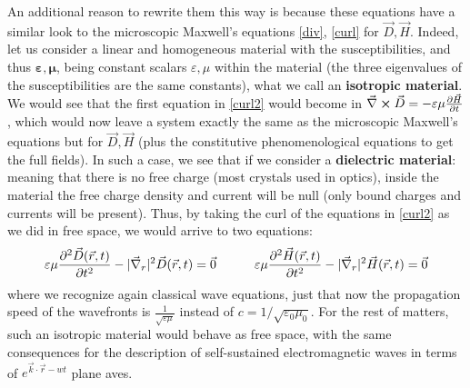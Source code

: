 \documentclass[11pt, a4paper, twoside]{article} %
\begin{document}
An additional reason to rewrite them this way is because these equations have a similar look to the microscopic Maxwell's equations \eqref{div}, \eqref{curl} for $\vec{D},\vec{H}$. Indeed, let us consider a linear and homogeneous material with the susceptibilities, and thus $\pmb{\varepsilon},\pmb{\mu}$, being constant scalars $\varepsilon,\mu$ within the material (the three eigenvalues of the susceptibilities are the same constants), what we call an {\bf isotropic material}. We would see that the first equation in \eqref{curl2} would become in $\vec{\nabla}\cross\vec{D}=-\varepsilon\mu\pdv{\vec{H}}{t}$, which would now leave a system exactly the same as the microscopic Maxwell's equations but for $\vec{D},\vec{H}$ (plus the constitutive phenomenological equations to get the full fields). In such a case, we see that if we consider a {\bf dielectric material}: meaning that there is no free charge (most crystals used in optics), inside the material the free charge density and current will be null (only bound charges and currents will be present). Thus, by taking the curl of the equations in \eqref{curl2} as we did in free space, we would arrive to two equations:
\begin{equation}
\varepsilon\mu\pdv[2]{\vec{D}(\vec{r},t)}{t}-|\vec{\nabla}_r|^2\vec{D}(\vec{r},t)=\vec{0} \quad \quad \quad \varepsilon\mu\pdv[2]{\vec{H}(\vec{r},t)}{t}-|\vec{\nabla}_r|^2\vec{H}(\vec{r},t)=\vec{0}
\end{equation}
where we recognize again classical wave equations, just that now the propagation speed of the wavefronts is $\frac{1}{\sqrt{\varepsilon\mu}}$ instead of $c={1}/{\sqrt{\varepsilon_0\mu_0}}$. For the rest of matters, such an isotropic material would behave as free space, with the same consequences for the description of self-sustained electromagnetic waves in terms of $e^{\vec{k}\cdot\vec{r}-wt}$ plane aves.
\end{document}
